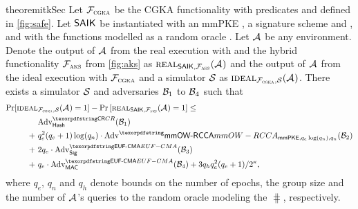 \newcommand{\ucideal}{\textnormal{\textsc{ideal}}}
\newcommand{\ucreal}{\textnormal{\textsc{real}}}
\begin{restatable}{theorem}{itkSec}\label{thm:saik-security}
	Let $\funcCGKA$ be the CGKA functionality with predicates \KwConf{} and \KwAuth{} defined in \cref{fig:safe}. Let $\saik$ be instantiated with an mmPKE \mmPKE, a signature scheme \sigscheme and \mac, and with the \hkdf functions modelled as a random oracle \hash.
	Let $\Adv$ be any environment. Denote the output of $\Adv$ from the real execution with \saik and the hybrid functionality $\funcPKI$ from \cref{fig:aks} as $\ucreal_{\saik, \funcPKI}(\Adv)$ and the output of $\Adv$ from the ideal execution with $\funcCGKA$ and a simulator $\ucsim$ as $\ucideal_{\funcCGKA, \ucsim}(\Adv)$.
	There exists a simulator $\ucsim$ and adversaries $\Bdv[1]$ to $\Bdv[4]$ such that
	\begin{align*}
		\Pr[\ucideal&_{\funcCGKA, \ucsim}(\Adv) = 1] - \Pr\left[\ucreal_{\saik, \funcPKI}(\Adv) = 1\right] \leq\\
		&\textnormal{Adv}^{\gamefont{CR}}_{\hash}(\Bdv[1]) \\
	+\ & q_e^2(q_e+1) \log(q_n) \cdot\textnormal{Adv}^\mmowrcca_{\mmPKE,q_e\log(q_n),q_n}(\Bdv[2]) \\
	+\ & 2q_e\cdot \textnormal{Adv}^{\ufcma}_\sigscheme(\Bdv[3]) \\
	+\ & q_e \cdot \textnormal{Adv}^{\ufcma}_\mac(\Bdv[4]) + 3q_hq_e^2(q_e+1)/2^\kappa,
\end{align*}
	where $q_e$, $q_n$ and $q_h$ denote bounds on the number of epochs, the group size and the number of $\Adv$'s queries to the random oracle modeling the $\hash$, respectively.
  \end{restatable}

